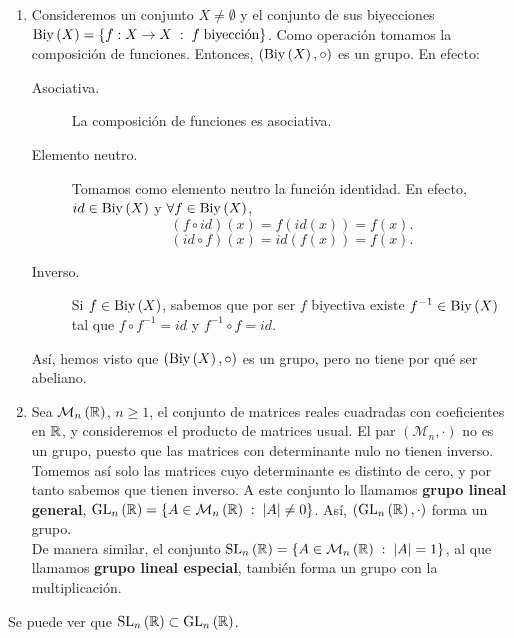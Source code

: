 \begin{eg}
\begin{enumerate}
	\item Consideremos un conjunto $\displaystyle X \neq \emptyset $ y el conjunto de sus biyecciones $\displaystyle \operatorname{Biy}\left(X\right) = \left\{ f : X \to X \; : \; f \; \text{biyección}\right\}  $. Como operación tomamos la composición de funciones. Entonces, $\displaystyle \left(\operatorname{Biy}\left(X\right), \circ\right) $ es un grupo. En efecto:
		\begin{description}
		\item[Asociativa.] La composición de funciones es asociativa.
		\item[Elemento neutro.] Tomamos como elemento neutro la función identidad. En efecto, $\displaystyle id \in \operatorname{Biy}\left(X\right) $ y $\displaystyle \forall f \in \operatorname{Biy}\left(X\right) $, 
			\[\left(f\circ id \right)\left(x\right) = f\left(id \left(x\right)\right) = f\left(x\right) .\]
		\[\left(id \circ f\right)\left(x\right) = id \left(f\left(x\right)\right) = f\left(x\right) .\]
	\item[Inverso.]	Si $\displaystyle f \in \operatorname{Biy}\left(X\right) $, sabemos que por ser $\displaystyle f $ biyectiva existe $\displaystyle f^{-1} \in \operatorname{Biy}\left(X\right) $ tal que $\displaystyle f \circ f^{-1} = id $ y $\displaystyle f^{-1} \circ f = id $. 
		\end{description}
	Así, hemos visto que $\displaystyle \left(\operatorname{Biy}\left(X\right), \circ\right) $ es un grupo, pero no tiene por qué ser abeliano.
\item Sea $\displaystyle \mathcal{M}_{n}\left(\mathbb{R}\right) $, $\displaystyle n \geq 1 $, el conjunto de matrices reales cuadradas con coeficientes en $\displaystyle \mathbb{R} $, y consideremos el producto de matrices usual. El par $\displaystyle \left(\mathcal{M}_{n}, \cdot\right) $ no es un grupo, puesto que las matrices con determinante nulo no tienen inverso. \\ 
	Tomemos así solo las matrices cuyo determinante es distinto de cero, y por tanto sabemos que tienen inverso. A este conjunto lo llamamos \textbf{grupo lineal general}, $\displaystyle \operatorname{GL}_{n}\left(\mathbb{R}\right) = \left\{ A \in \mathcal{M}_{n}\left(\mathbb{R}\right) \; : \; \left|A\right| \neq 0\right\}  $. Así, $\displaystyle \left(\operatorname{GL}_{n}\left(\mathbb{R}\right), \cdot\right) $ forma un grupo. \\
	De manera similar, el conjunto $\displaystyle \operatorname{SL}_{n}\left(\mathbb{R}\right) = \left\{ A \in \mathcal{M}_{n}\left(\mathbb{R}\right) \; : \; \left|A\right| = 1\right\}  $, al que llamamos \textbf{grupo lineal especial}, también forma un grupo con la multiplicación. 
\end{enumerate}
\end{eg}
\begin{observation}
Se puede ver que $\displaystyle \operatorname{SL}_{n}\left(\mathbb{R}\right) \subset \operatorname{GL}_{n}\left(\mathbb{R}\right) $. 
\end{observation}
